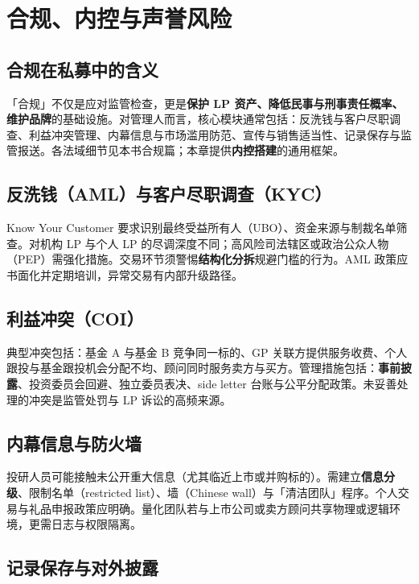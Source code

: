 \chapter{合规、内控与声誉风险}

\section{合规在私募中的含义}

「合规」不仅是应对监管检查，更是\textbf{保护 LP 资产、降低民事与刑事责任概率、维护品牌}的基础设施。对管理人而言，核心模块通常包括：反洗钱与客户尽职调查、利益冲突管理、内幕信息与市场滥用防范、宣传与销售适当性、记录保存与监管报送。各法域细节见本书合规篇；本章提供\textbf{内控搭建}的通用框架。

\section{反洗钱（AML）与客户尽职调查（KYC）}

Know Your Customer 要求识别最终受益所有人（UBO）、资金来源与制裁名单筛查。对机构 LP 与个人 LP 的尽调深度不同；高风险司法辖区或政治公众人物（PEP）需强化措施。交易环节须警惕\textbf{结构化分拆}规避门槛的行为。AML 政策应书面化并定期培训，异常交易有内部升级路径。

\section{利益冲突（COI）}

典型冲突包括：基金 A 与基金 B 竞争同一标的、GP 关联方提供服务收费、个人跟投与基金跟投机会分配不均、顾问同时服务卖方与买方。管理措施包括：\textbf{事前披露}、投资委员会回避、独立委员表决、side letter 台账与公平分配政策。未妥善处理的冲突是监管处罚与 LP 诉讼的高频来源。

\section{内幕信息与防火墙}

投研人员可能接触未公开重大信息（尤其临近上市或并购标的）。需建立\textbf{信息分级}、限制名单（restricted list）、墙（Chinese wall）与「清洁团队」程序。个人交易与礼品申报政策应明确。量化团队若与上市公司或卖方顾问共享物理或逻辑环境，更需日志与权限隔离。

\section{记录保存与对外披露}

